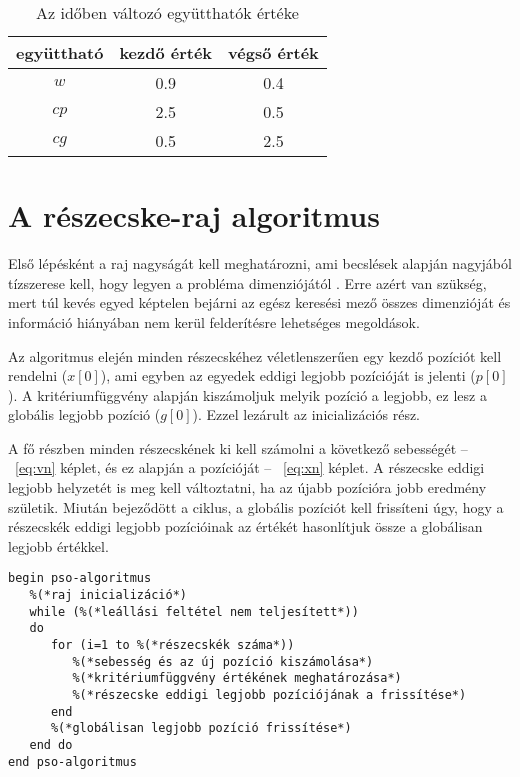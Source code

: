 \begin{table}
    \centering
    \begin{tabular}{|c|c|c|}
    \hline
    együttható & kezdő érték & végső érték \\ \hline
    \hline
    $w$ & 0.9 & 0.4 \\ \hline
    $cp$ & 2.5 & 0.5 \\ \hline
    $cg$ & 0.5 & 2.5 \\ \hline
    \end{tabular}
    \caption{Az időben változó együtthatók értéke \parencite{kanovic2017}}
    \label{tab:psokomp}
\end{table}

\section{A részecske-raj algoritmus}

Első lépésként a raj nagyságát kell meghatározni, ami becslések alapján nagyjából tízszerese kell, hogy legyen a probléma dimenziójától \parencite{rapaic2019}. Erre azért van szükség, mert túl kevés egyed képtelen bejárni az egész keresési mező összes dimenzióját és információ hiányában nem kerül felderítésre lehetséges megoldások.

Az algoritmus elején minden részecskéhez véletlenszerűen egy kezdő pozíciót kell rendelni ($x[0]$), ami egyben az egyedek eddigi legjobb pozícióját is jelenti ($p[0]$). A kritériumfüggvény alapján kiszámoljuk melyik pozíció a legjobb, ez lesz a globális legjobb pozíció ($g[0]$). Ezzel lezárult az inicializációs rész.

A fő részben minden részecskének ki kell számolni a következő sebességét -- ~\ref{eq:vn} képlet, és ez alapján a pozícióját -- ~\ref{eq:xn} képlet. A részecske eddigi legjobb helyzetét is meg kell változtatni, ha az újabb pozícióra jobb eredmény születik. Miután bejeződött a ciklus, a globális pozíciót kell frissíteni úgy, hogy a részecskék eddigi legjobb pozícióinak az értékét hasonlítjuk össze a globálisan legjobb értékkel.

\linespread{1}
\begin{lstlisting}[caption={A részecske-raj algoritmus pszeudokódja \parencite{dorigo2008}}, captionpos=b]
begin pso-algoritmus
   %(*raj inicializáció*)
   while (%(*leállási feltétel nem teljesített*))
   do
      for (i=1 to %(*részecskék száma*))
         %(*sebesség és az új pozíció kiszámolása*)
         %(*kritériumfüggvény értékének meghatározása*)
         %(*részecske eddigi legjobb pozíciójának a frissítése*)
      end
      %(*globálisan legjobb pozíció frissítése*)
   end do
end pso-algoritmus
\end{lstlisting}

